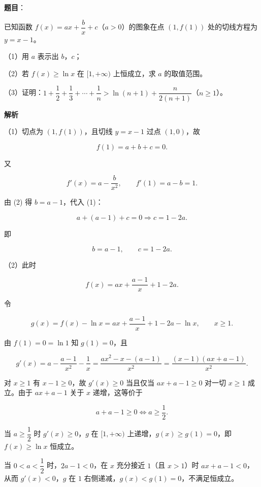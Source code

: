 \begin{answer}

\textbf{题目}：

已知函数 $f(x)=ax+\dfrac bx+c$（$a>0$）的图象在点 $(1,f(1))$ 处的切线方程为 $y=x-1$。

（1）用 $a$ 表示出 $b$，$c$；

（2）若 $f(x)\geqslant\ln x$ 在 $[1,+\infty)$ 上恒成立，求 $a$ 的取值范围。

（3）证明：$1+\dfrac12+\dfrac13+\cdots+\dfrac1n>\ln(n+1)+\dfrac{n}{2(n+1)}$（$n\geqslant1$）。

\textbf{解析}

（1）切点为 $(1,f(1))$，且切线 $y=x-1$ 过点 $(1,0)$，故

\nopagebreak[4]
\[f(1)=a+b+c=0. \tag{1}\]

又

\nopagebreak[4]
\[f'(x)=a-\frac{b}{x^2},\qquad f'(1)=a-b=1. \tag{2}\]

由 (2) 得 $b=a-1$，代入 (1)：

\nopagebreak[4]
\[a+(a-1)+c=0\Longrightarrow c=1-2a.\]

即

\nopagebreak[4]
\[b=a-1,\qquad c=1-2a.\]

（2）此时

\nopagebreak[4]
\[f(x)=ax+\frac{a-1}{x}+1-2a.\]

令

\nopagebreak[4]
\[g(x)=f(x)-\ln x=ax+\frac{a-1}{x}+1-2a-\ln x,\qquad x\geqslant1.\]

由 $f(1)=0=\ln1$ 知 $g(1)=0$，且

\nopagebreak[4]
\[g'(x)=a-\frac{a-1}{x^2}-\frac1x
=\frac{ax^2-x-(a-1)}{x^2}
=\frac{(x-1)(ax+a-1)}{x^2}.\]

对 $x\geqslant1$ 有 $x-1\geqslant0$，故 $g'(x)\geqslant0$ 当且仅当 $ax+a-1\geqslant0$ 对一切 $x\geqslant1$ 成立。由于 $ax+a-1$ 关于 $x$ 递增，这等价于

\nopagebreak[4]
\[a+a-1\geqslant0\iff a\geqslant\frac12.\]

当 $a\geqslant\dfrac12$ 时 $g'(x)\geqslant0$，$g$ 在 $[1,+\infty)$ 上递增，$g(x)\geqslant g(1)=0$，即 $f(x)\geqslant\ln x$ 恒成立。

当 $0<a<\dfrac12$ 时，$2a-1<0$，在 $x$ 充分接近 $1$（且 $x>1$）时 $ax+a-1<0$，从而 $g'(x)<0$，$g$ 在 $1$ 右侧递减，$g(x)<g(1)=0$，不满足恒成立。


\end{answer}
